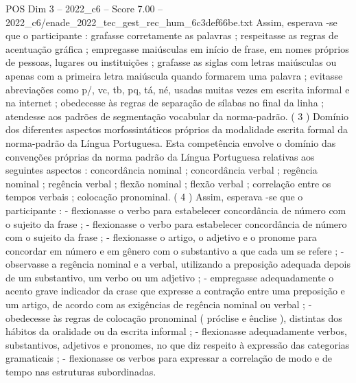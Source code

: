 \begin{textsample}{POS Dim 3 – 2022\_c6 – Score 7.00 – 2022\_c6/enade\_2022\_tec\_gest\_rec\_hum\_6c3def66be.txt}
Assim, esperava -se que o participante : grafasse corretamente as palavras ; respeitasse as regras de acentuação gráfica ; empregasse maiúsculas em início de frase, em nomes próprios de pessoas, lugares ou instituições ; grafasse as siglas com letras maiúsculas ou apenas com a primeira letra maiúscula quando formarem uma palavra ; evitasse abreviações como p/, vc, tb, pq, tá, né, usadas muitas vezes em escrita informal e na internet ; obedecesse às regras de separação de sílabas no final da linha ; atendesse aos padrões de segmentação vocabular da norma-padrão. ( 3 ) Domínio dos diferentes aspectos morfossintáticos próprios da modalidade escrita formal da norma-padrão da Língua Portuguesa.
Esta competência envolve o domínio das convenções próprias da norma padrão da Língua Portuguesa relativas aos seguintes aspectos : concordância nominal ; concordância verbal ; regência nominal ; regência verbal ; flexão nominal ; flexão verbal ; correlação entre os tempos verbais ; colocação pronominal. ( 4 ) Assim, esperava -se que o participante : - flexionasse o verbo para estabelecer concordância de número com o sujeito da frase ; - flexionasse o verbo para estabelecer concordância de número com o sujeito da frase ; - flexionasse o artigo, o adjetivo e o pronome para concordar em número e em gênero com o substantivo a que cada um se refere ; - observasse a regência nominal e a verbal, utilizando a preposição adequada depois de um substantivo, um verbo ou um adjetivo ; - empregasse adequadamente o acento grave indicador da crase que expresse a contração entre uma preposição e um artigo, de acordo com as exigências de regência nominal ou verbal ; - obedecesse às regras de colocação pronominal ( próclise e ênclise ), distintas dos hábitos da oralidade ou da escrita informal ; - flexionasse adequadamente verbos, substantivos, adjetivos e pronomes, no que diz respeito à expressão das categorias gramaticais ; - flexionasse os verbos para expressar a correlação de modo e de tempo nas estruturas subordinadas.

\end{textsample}
